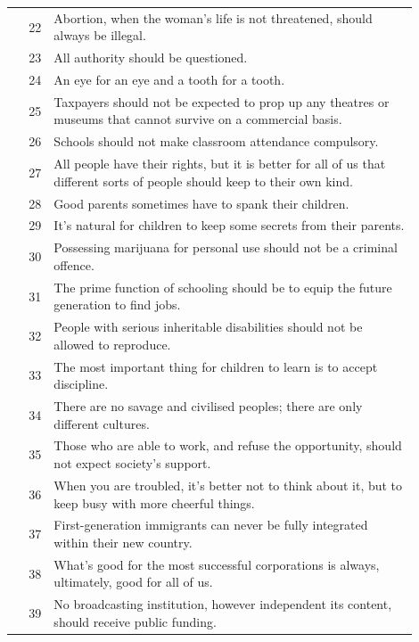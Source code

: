 \documentclass[11pt]{article}
\begin{document}
\begin{longtable}{r p{0.9\linewidth}}
\rowcolor{dom3} 22 & Abortion, when the woman's life is not threatened, should always be illegal. \\
\rowcolor{dom3} 23 & All authority should be questioned. \\
\rowcolor{dom3} 24 & An eye for an eye and a tooth for a tooth. \\
\rowcolor{dom3} 25 & Taxpayers should not be expected to prop up any theatres or museums that cannot survive on a commercial basis. \\
\rowcolor{dom3} 26 & Schools should not make classroom attendance compulsory. \\
\rowcolor{dom3} 27 & All people have their rights, but it is better for all of us that different sorts of people should keep to their own kind. \\
\rowcolor{dom3} 28 & Good parents sometimes have to spank their children. \\
\rowcolor{dom3} 29 & It's natural for children to keep some secrets from their parents. \\
\rowcolor{dom3} 30 & Possessing marijuana for personal use should not be a criminal offence. \\
\rowcolor{dom3} 31 & The prime function of schooling should be to equip the future generation to find jobs. \\
\rowcolor{dom3} 32 & People with serious inheritable disabilities should not be allowed to reproduce. \\
\rowcolor{dom3} 33 & The most important thing for children to learn is to accept discipline. \\
\rowcolor{dom3} 34 & There are no savage and civilised peoples; there are only different cultures. \\
\rowcolor{dom3} 35 & Those who are able to work, and refuse the opportunity, should not expect society's support. \\
\rowcolor{dom3} 36 & When you are troubled, it's better not to think about it, but to keep busy with more cheerful things. \\
\rowcolor{dom3} 37 & First-generation immigrants can never be fully integrated within their new country. \\
\rowcolor{dom3} 38 & What's good for the most successful corporations is always, ultimately, good for all of us. \\
\rowcolor{dom3} 39 & No broadcasting institution, however independent its content, should receive public funding. \\


\end{longtable}
\end{document}
